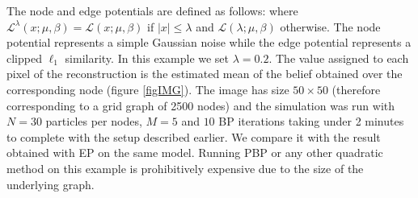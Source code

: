 The node and edge potentials are defined as follows:
where $\mathcal L^{\lambda}(x;\mu,\beta)=\mathcal L(x;\mu,\beta)$ if $|x|\le \lambda$ and $\mathcal L(\lambda;\mu,\beta)$ otherwise. 
The node potential represents a simple Gaussian noise while the edge potential represents a clipped $\ell_{1}$ similarity. In this example we set $\lambda=0.2$. The value assigned to each pixel of the reconstruction is the estimated mean of the belief obtained over the corresponding node (figure \ref{figIMG}). The image has size $50\times 50$ (therefore corresponding to a grid graph of 2500 nodes) and the simulation was run with $N=30$ particles per nodes, $M=5$ and $10$ BP iterations taking under 2 minutes to complete with the setup described earlier. 
We compare it with the result obtained with EP on the same model. 
Running PBP or any other quadratic method on this example is prohibitively expensive due to the size of the underlying graph.

